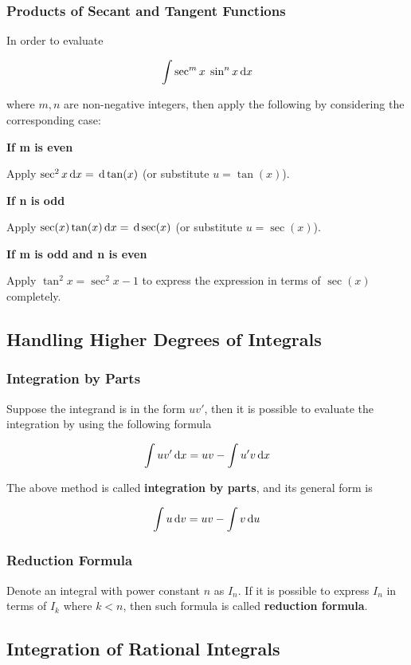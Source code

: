 \documentclass[a4paper,12pt]{article}
\begin{document}
\subsubsection{Products of Secant and Tangent Functions}
In order to evaluate

$$\int\sec^{m}x\;\sin^{n}x\,\mathrm{d} x$$\s

where $m,n$ are non-negative integers, then apply the following by considering the corresponding case:

\begin{alist}
  \item \textbf{If m is even}\n

  Apply $\sec^{2}x\,\mathrm{d} x=\,\mathrm{d}\tan(x)$ (or substitute $u=\tan(x)$).

  \item \textbf{If n is odd}\n

  Apply $\sec(x)\tan(x)\,\mathrm{d} x=\,\mathrm{d}\sec(x)$ (or substitute $u=\sec(x)$).

  \item \textbf{If m is odd and n is even}\n

  Apply $\tan^{2}x=\sec^{2}x-1$ to express the expression in terms of $\sec(x)$ completely.
\end{alist}

\subsection{Handling Higher Degrees of Integrals}
\subsubsection{Integration by Parts}
Suppose the integrand is in the form $uv'$, then it is possible to evaluate the integration by using the following formula

$$\int uv'\,\mathrm{d} x=uv-\int u'v\,\mathrm{d} x$$

The above method is called \textbf{integration by parts}, and its general form is

$$\int u\,\mathrm{d} v=uv-\int v\,\mathrm{d} u$$

\subsubsection{Reduction Formula}
Denote an integral with power constant $n$ as $I_{n}$. If it is possible to express $I_{n}$ in terms of $I_{k}$ where $k<n$, then such formula is called \textbf{reduction formula}.

\subsection{Integration of Rational Integrals}
\end{document}
